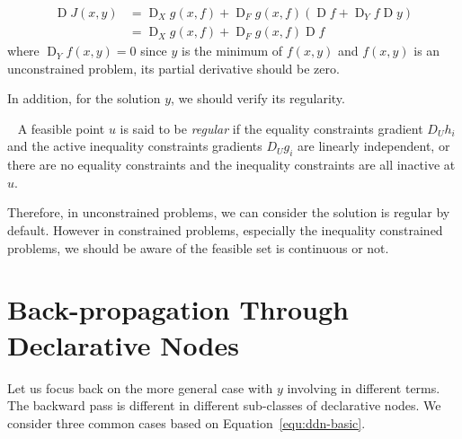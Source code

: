 \begin{equation}
    \begin{aligned} 
        \operatorname{D} J(x, y) &=\operatorname{D}_{X} g(x, f)+\operatorname{D}_{F} g(x, f)\left(\operatorname{D} f+\operatorname{D}_{Y} f \operatorname{D} y\right) \\ &=\operatorname{D}_{X} g(x, f)+\operatorname{D}_{F} g(x, f) \operatorname{D} f 
    \end{aligned}
\end{equation}
where $\operatorname{D}_Yf(x,y) = 0$ since $y$ is the minimum of $f(x,y)$ and $f(x,y)$ is an unconstrained problem, its partial derivative should be zero. 
\par In addition, for the solution $y$, we should verify its regularity. 
\begin{defn}~\citep{SG:19}
    \label{defn:regular-point}
    A feasible point $u$ is said to be \emph{regular} if the equality constraints gradient $D_Uh_i$ and the active inequality constraints gradients $D_Ug_i$ are linearly independent, or there are no equality constraints and the inequality constraints are all inactive at $u$.
\end{defn}
Therefore, in unconstrained problems, we can consider the solution is regular by default. However in constrained problems, especially the inequality constrained problems, we should be aware of the feasible set is continuous or not. 

\section{Back-propagation Through Declarative Nodes}
\label{sec:bp}
Let us focus back on the more general case with $y$ involving in different terms. The backward pass is different in different sub-classes of declarative nodes. We consider three common cases based on Equation~\ref{equ:ddn-basic}. 

